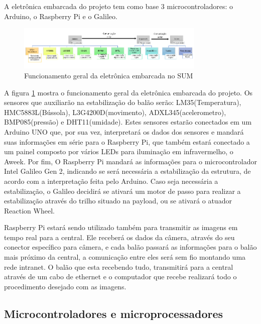 A eletrônica embarcada do projeto tem como base 3 microcontroladores: o Arduino, o Raspberry Pi e o Galileo.

\begin{figure}[H]
	\centering
	\includegraphics[width=0.8\textwidth]{figuras/eletronicaembarcadasum}
	\caption{Funcionamento geral da eletrônica embarcada no SUM}
	\label{img:eletronicaembarcadasum}
\end{figure}

A figura \ref{img:eletronicaembarcadasum} mostra o funcionamento geral da eletrônica embarcada do projeto. Os sensores que auxiliarão na estabilização do balão serão: LM35(Temperatura), HMC5883L(Bússola), L3G4200D(movimento), ADXL345(acelerometro), BMP085(pressão) e DHT11(umidade). Estes sensores estarão conectados em um Arduino UNO que, por sua vez, interpretará os dados dos sensores e mandará suas informações em série para o Raspberry Pi, que também estará conectado a um painel composto por vários LEDs para iluminação em infravermelho, o Aweek. Por fim, O Raspberry Pi mandará as informações para o microcontrolador Intel Galileo Gen 2, indicando se será necessária a estabilização da estrutura, de acordo com a interpretação feita pelo Arduino. Caso seja necessária a estabilização, o Galileo decidirá se ativará um motor de passo para realizar a estabilização através do trilho situado na payload, ou se ativará o atuador Reaction Wheel.

Raspberry Pi estará sendo utilizado também para transmitir as imagens em tempo real para a central. Ele receberá os dados da câmera, através do seu conector específico para câmera, e cada balão passará as informações para o balão mais próximo da central, a comunicação entre eles será sem fio montando uma rede intranet. O balão que esta recebendo tudo, transmitirá para a central através de um cabo de ethernet e o computador que recebe realizará todo o procedimento desejado com as imagens.

\subsection{Microcontroladores e microprocessadores}

